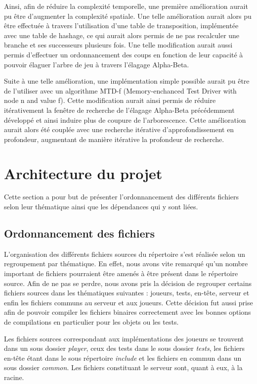 \documentclass[11pt]{article}
\begin{document}
Ainsi, afin de réduire la complexité temporelle, une première amélioration aurait pu être d'augmenter la complexité spatiale. Une telle amélioration aurait alors pu être effectuée à travers l'utilisation d'une table de transposition, implémentée avec une table de hashage, ce qui aurait alors permis de ne pas recalculer une branche et ses successeurs plusieurs fois. Une telle modification aurait aussi permis d'effectuer un ordonnancement des coups en fonction de leur capacité à pouvoir élaguer l'arbre de jeu à travers l'élagage Alpha-Beta.

Suite à une telle amélioration, une implémentation simple possible aurait pu être de l'utiliser avec un algorithme MTD-f (Memory-enchanced Test Driver with node n and value f). Cette modification aurait ainsi permis de réduire itérativement la fenêtre de recherche de l'élagage Alpha-Beta précédemment développé et ainsi induire plus de coupure de l'arborescence. Cette amélioration aurait alors été couplée avec une recherche itérative d'approfondissement en profondeur, augmentant de manière itérative la profondeur de recherche.


\newpage
\section{Architecture du projet}
Cette section a pour but de présenter l'ordonnancement des différents fichiers selon leur thématique ainsi que les dépendances qui y sont liées.

\subsection{Ordonnancement des fichiers}
L'organisation des différents fichiers sources du répertoire s'est réalisée selon un regroupement par thématique. En effet, nous avons vite remarqué qu'un nombre important de fichiers pourraient être amenés à être présent dans le répertoire source. Afin de ne pas se perdre, nous avons pris la décision de regrouper certains fichiers sources dans les thématiques suivantes : joueurs, tests, en-tête, serveur et enfin les fichiers communs au serveur et aux joueurs. Cette décision fut aussi prise afin de pouvoir compiler les fichiers binaires correctement avec les bonnes options de compilations en particulier pour les objets ou les tests.

Les fichiers sources correspondant aux implémentations des joueurs se trouvent dans un sous dossier \textit{player}, ceux des tests dans le sous dossier \textit{tests}, les fichiers en-tête étant dans le sous répertoire \textit{include} et les fichiers en commun dans un sous dossier \textit{common}. Les fichiers constituant le serveur sont, quant à eux, à la racine. 
\end{document}
